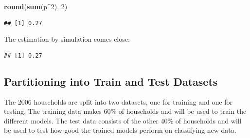 \documentclass[]{article}
\newenvironment{Shaded}{\begin{snugshade}}{\end{snugshade}}
\newcommand{\ControlFlowTok}[1]{\textcolor[rgb]{0.13,0.29,0.53}{\textbf{#1}}}
\newcommand{\DataTypeTok}[1]{\textcolor[rgb]{0.13,0.29,0.53}{#1}}
\newcommand{\DecValTok}[1]{\textcolor[rgb]{0.00,0.00,0.81}{#1}}
\newcommand{\FloatTok}[1]{\textcolor[rgb]{0.00,0.00,0.81}{#1}}
\newcommand{\KeywordTok}[1]{\textcolor[rgb]{0.13,0.29,0.53}{\textbf{#1}}}
\newcommand{\NormalTok}[1]{#1}
\newcommand{\OperatorTok}[1]{\textcolor[rgb]{0.81,0.36,0.00}{\textbf{#1}}}
\newcommand{\OtherTok}[1]{\textcolor[rgb]{0.56,0.35,0.01}{#1}}
\newcommand{\StringTok}[1]{\textcolor[rgb]{0.31,0.60,0.02}{#1}}
\begin{document}
\begin{Shaded}
\begin{Highlighting}[]
\KeywordTok{round}\NormalTok{(}\KeywordTok{sum}\NormalTok{(p}\OperatorTok{^}\DecValTok{2}\NormalTok{), }\DecValTok{2}\NormalTok{)}
\end{Highlighting}
\end{Shaded}

\begin{verbatim}
## [1] 0.27
\end{verbatim}

The estimation by simulation comes close:

\begin{Shaded}
\end{Shaded}

\begin{verbatim}
## [1] 0.27
\end{verbatim}

\hypertarget{partitioning-into-train-and-test-datasets}{%
\subsection{Partitioning into Train and Test
Datasets}\label{partitioning-into-train-and-test-datasets}}

The 2006 households are split into two datasets, one for training and
one for testing. The training data makes 60\% of households and will be
used to train the different models. The test data consists of the other
40\% of households and will be used to test how good the trained models
perform on classifying new data.

\begin{Shaded}
\end{Shaded}
\end{document}
